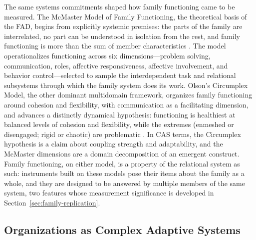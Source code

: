 \documentclass[12pt, letterpaper]{article}
\begin{document}
The same systems commitments shaped how family functioning came to be measured. The McMaster Model of Family Functioning, the theoretical basis of the FAD, begins from explicitly systemic premises: the parts of the family are interrelated, no part can be understood in isolation from the rest, and family functioning is more than the sum of member characteristics \parencite{epstein1978,miller2000}. The model operationalizes functioning across six dimensions---problem solving, communication, roles, affective responsiveness, affective involvement, and behavior control---selected to sample the interdependent task and relational subsystems through which the family system does its work. Olson's Circumplex Model, the other dominant multidomain framework, organizes family functioning around cohesion and flexibility, with communication as a facilitating dimension, and advances a distinctly dynamical hypothesis: functioning is healthiest at balanced levels of cohesion and flexibility, while the extremes (enmeshed or disengaged; rigid or chaotic) are problematic \parencite{olson2000}. In CAS terms, the Circumplex hypothesis is a claim about coupling strength and adaptability, and the McMaster dimensions are a domain decomposition of an emergent construct. Family functioning, on either model, is a property of the relational system as such: instruments built on these models pose their items about the family as a whole, and they are designed to be answered by multiple members of the same system, two features whose measurement significance is developed in Section~\ref{sec:family-replication}.

\subsection{Organizations as Complex Adaptive Systems}
\label{sec:org-cas}
\end{document}
